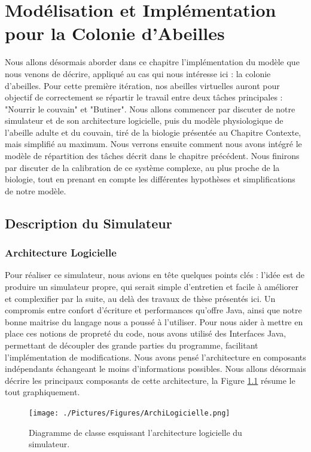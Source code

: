 \chapter{Modélisation et Implémentation pour la Colonie d'Abeilles}

	Nous allons désormais aborder dans ce chapitre l'implémentation du modèle que nous venons de décrire, appliqué au cas qui nous intéresse ici : la colonie d'abeilles. Pour cette première itération, nos abeilles virtuelles auront pour objectif de correctement se répartir le travail entre deux tâches principales : "Nourrir le couvain" et "Butiner". Nous allons commencer par discuter de notre simulateur et de son architecture logicielle, puis du modèle physiologique de l'abeille adulte et du couvain, tiré de la biologie présentée au Chapitre Contexte, mais simplifié au maximum. Nous verrons ensuite comment nous avons intégré le modèle de répartition des tâches décrit dans le chapitre précédent. Nous finirons par discuter de la calibration de ce système complexe, au plus proche de la biologie, tout en prenant en compte les différentes hypothèses et simplifications de notre modèle.
	
	\section{Description du Simulateur}
		\subsection{Architecture Logicielle}
			Pour réaliser ce simulateur, nous avions en tête quelques points clés : l'idée est de produire un simulateur propre, qui serait simple d'entretien et facile à améliorer et complexifier par la suite, au delà des travaux de thèse présentés ici. Un compromis entre confort d'écriture et performances qu'offre Java, ainsi que notre bonne maitrise du langage nous a poussé à l'utiliser. Pour nous aider à mettre en place ces notions de propreté du code, nous avons utilisé des Interfaces Java, permettant de découpler des grande parties du programme, facilitant l'implémentation de modifications. Nous avons pensé l'architecture en composants indépendants échangeant le moins d'informations possibles. Nous allons désormais décrire les principaux composants de cette architecture, la Figure \ref{ArchiLogicielle} résume le tout graphiquement.
			
			\begin{figure}
			\centering
			\texttt{[image: ./Pictures/Figures/ArchiLogicielle.png]}
			\caption{Diagramme de classe esquissant l'architecture logicielle du simulateur.}
			\label{ArchiLogicielle}
			\end{figure}
			
